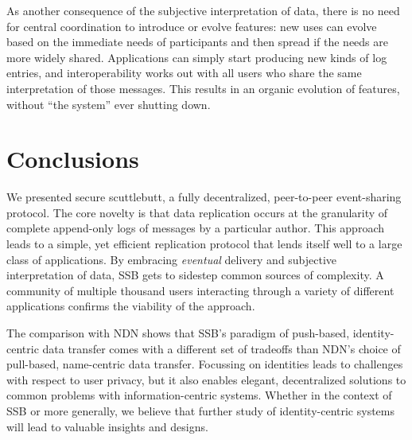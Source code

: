 \documentclass[9pt,sigconf,rewiew]{acmart}
\begin{document}
As another consequence of the subjective interpretation of data, there is no need for central coordination to introduce or evolve features: new uses can evolve based on the immediate needs of participants and then spread if the needs are more widely shared. Applications can simply start producing new kinds of log entries, and interoperability works out with all users who share the same interpretation of those messages.  This results in an organic evolution of features, without ``the system'' ever shutting down.



\section{Conclusions}

We presented secure scuttlebutt, a fully decentralized, peer-to-peer event-sharing protocol. The core novelty is that data replication occurs at the granularity of complete append-only logs of messages by a particular author. This approach leads to a simple, yet efficient replication protocol that lends itself well to a large class of applications. By embracing \textit{eventual} delivery and subjective interpretation of data, SSB gets to sidestep common sources of complexity. A community of multiple thousand users interacting through a variety of different applications confirms the viability of the approach.

The comparison with NDN shows that SSB's paradigm of push-based, identity-centric data transfer comes with a different set of tradeoffs than NDN's choice of pull-based, name-centric data transfer. Focussing on identities leads to challenges with respect to user privacy, but it also enables elegant, decentralized solutions to common problems with information-centric systems. Whether in the context of SSB or more generally, we believe that further study of identity-centric systems will lead to valuable insights and designs.

\newpage
\clearpage
\newpage


\end{document}
